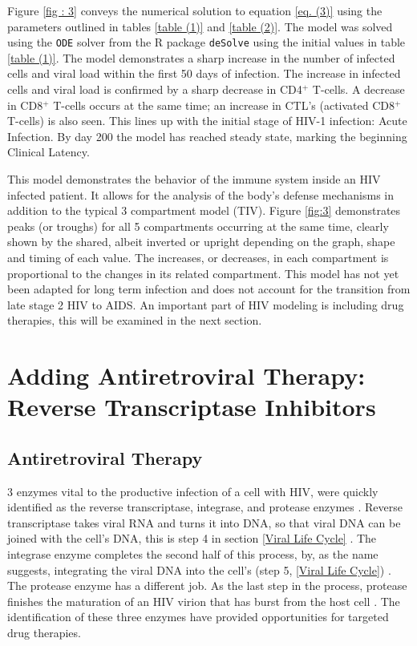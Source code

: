 \documentclass[letterpaper, 11 pt, conference]{ieeeconf}
\begin{document}
Figure \ref{fig : 3} conveys the numerical solution to equation \ref{eq. (3)} using the parameters outlined in tables \ref{table (1)} and \ref{table (2)}. The model was solved using the \texttt{ODE} solver from the R package \texttt{deSolve} using the initial values in table \ref{table (1)}. The model demonstrates a sharp increase in the number of infected cells and viral load within the first 50 days of infection. The increase in infected cells and viral load is confirmed by a sharp decrease in CD4$^{+}$ T-cells. A decrease in CD8$^{+}$ T-cells occurs at the same time; an increase in CTL's (activated CD8$^{+}$ T-cells) is also seen. This lines up with the initial stage of HIV-1 infection: Acute Infection. By day 200 the model has reached steady state, marking the beginning Clinical Latency. 

This model demonstrates the behavior of the immune system inside an HIV infected patient. It allows for the analysis of the body's defense mechanisms in addition to the typical 3 compartment model (TIV). Figure \ref{fig:3} demonstrates peaks (or troughs) for all 5 compartments occurring at the same time, clearly shown by the shared, albeit inverted or upright depending on the graph, shape and timing of each value. The increases, or decreases, in each compartment is proportional to the changes in its related compartment. This model has not yet been adapted for long term infection and does not account for the transition from late stage 2 HIV to AIDS. An important part of HIV modeling is including drug therapies, this will be examined in the next section. 

\section{Adding Antiretroviral Therapy: Reverse Transcriptase Inhibitors}

\subsection{Antiretroviral Therapy}
3 enzymes vital to the productive infection of a cell with HIV, were quickly identified as the reverse transcriptase, integrase, and protease enzymes \cite{LookBack}. Reverse transcriptase takes viral RNA and turns it into DNA, so that viral DNA can be joined with the cell's DNA, this is step 4 in section \ref{Viral Life Cycle} \cite{HIVlifeCycle}. The integrase enzyme completes the second half of this process, by, as the name suggests, integrating the viral DNA into the cell's (step 5, \ref{Viral Life Cycle}) \cite{HIVlifeCycle}. The protease enzyme has a different job. As the last step in the process, protease finishes the maturation of an HIV virion that has burst from the host cell \cite{HIVlifeCycle}. The identification of these three enzymes have provided opportunities for targeted drug therapies.
\end{document}
